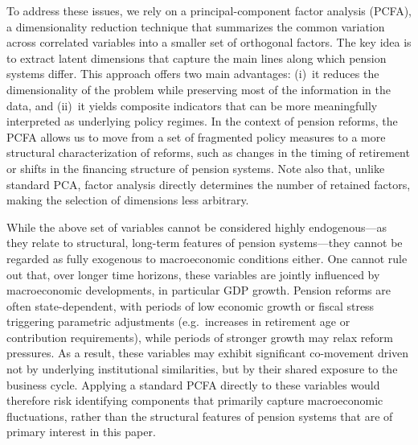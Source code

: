 \documentclass[11pt,english,a4paper, twoside, authoryear]{article}
\begin{document}
To address these issues, we rely on a principal-component factor analysis (PCFA), a dimensionality reduction technique that summarizes the common variation across correlated variables into a smaller set of orthogonal factors. The key idea is to extract latent dimensions that capture the main lines along which pension systems differ. This approach offers two main advantages: (i)~it reduces the dimensionality of the problem while preserving most of the information in the data, and (ii)~it yields composite indicators that can be more meaningfully interpreted as underlying policy regimes. In the context of pension reforms, the PCFA allows us to move from a set of fragmented policy measures to a more structural characterization of reforms, such as changes in the timing of retirement or shifts in the financing structure of pension systems. Note also that, unlike standard PCA, factor analysis directly determines the number of retained factors, making the selection of dimensions less arbitrary.



While the above set of variables cannot be considered highly endogenous---as they relate to structural, long-term features of pension systems---they cannot be regarded as fully exogenous to macroeconomic conditions either. One cannot rule out that, over longer time horizons, these variables are jointly influenced by macroeconomic developments, in particular GDP growth. Pension reforms are often state-dependent, with periods of low economic growth or fiscal stress triggering parametric adjustments (e.g.\ increases in retirement age or contribution requirements), while periods of stronger growth may relax reform pressures. As a result, these variables may exhibit significant co-movement driven not by underlying institutional similarities, but by their shared exposure to the business cycle. Applying a standard PCFA directly to these variables would therefore risk identifying components that primarily capture macroeconomic fluctuations, rather than the structural features of pension systems that are of primary interest in this paper.
\end{document}
